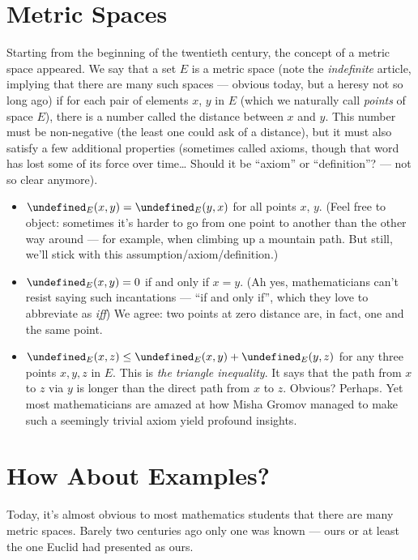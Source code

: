 \documentclass{amsart}
\let\d=\undefined
\DeclareMathOperator{\d}{d}
\begin{document}
\section{Metric Spaces}

Starting from the beginning of the twentieth century, the concept of a
metric space appeared. We say that a set $E$ is a metric space (note
the \textit{indefinite} article, implying that there are many such
spaces --- obvious today, but a heresy not so long ago) if for each
pair of elements $x$, $y$ in $E$ (which we naturally call
\textit{points} of space $E$), there is a number called the distance
between $x$ and $y$.
This number must be non-negative (the least one could ask of a
distance), but it must also satisfy a few additional properties
(sometimes called axioms, though that word has lost some of its force
over time\dots{} Should it be ``axiom'' or ``definition''? --- not so clear
anymore).

\begin{itemize}[left=0pt]
\item $\d_{E}(x,y)=\d_{E}(y,x)$ for all points $x$, $y$.
  (Feel free to object: sometimes it’s harder to go from one point to
  another than the other way around --- for example, when climbing up a
  mountain path. But still, we’ll stick with this
  assumption/axiom/definition.)
\item $\d_{E}(x,y)=0$ if and only if $x=y$. (Ah yes, mathematicians
  can’t resist saying such incantations --- ``if and only if'', which
  they love to abbreviate as \textit{iff}) We agree: two points at
  zero distance are, in fact, one and the same point.
\item $\d_{E}(x,z)\leq\d_{E}(x,y)+\d_{E}(y,z)$ for any three points
  $x,y,z$ in $E$. This is \textit{the triangle inequality}.  It says
  that the path from $x$ to $z$ via $y$ is longer than the direct path
  from $x$ to $z$. Obvious? Perhaps. Yet most mathematicians are
  amazed at how Misha Gromov managed to make such a seemingly trivial
  axiom yield profound insights.
\end{itemize}

\section{How About Examples?}
Today, it’s almost obvious to most mathematics students that there are
many metric spaces. Barely two centuries ago only one was known ---
ours or at least the one Euclid had presented as ours.
\end{document}
